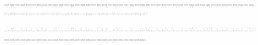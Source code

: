


\newpage
========================================================================


========================================================================
\newpage
